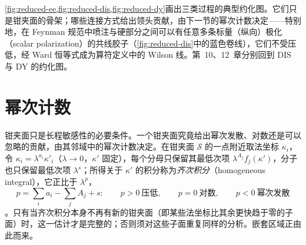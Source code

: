 \cref{fig:reduced-ee,fig:reduced-dis,fig:reduced-dy}画出三类过程的典型约化图。它们只是钳夹面的骨架；哪些连接方式给出领头贡献，由下一节的幂次计数决定——特别地，在 Feynman 规范中喷注与硬部分之间可以有任意多条标量（纵向）极化（scalar polarization）的共线胶子（\cref{fig:reduced-dis}中的蓝色卷线），它们不受压低，经 Ward 恒等式成为算符定义中的 Wilson 线。第~10、12~章分别回到 DIS 与 DY 的约化图。
\section{幂次计数}\label{sec:ir-power}

钳夹面只是长程敏感性的必要条件。一个钳夹面究竟给出幂次发散、对数还是可以忽略的贡献，由其邻域中的幂次计数决定\cite[第~2.3~节]{Sterman:1995fz}。在钳夹面 $\mathcal S$ 的一点附近取法坐标 $\kappa_i$，令 $\kappa_i=\lambda^{a_i}\kappa'_i$（$\lambda\to0$，$\kappa'$ 固定），每个分母只保留其最低次项 $\lambda^{A_j}f_j(\kappa')$，分子也只保留最低次项 $\lambda^{s}$；所得关于 $\kappa'$ 的积分称为\emph{齐次积分}（homogeneous integral），它正比于 $\lambda^{p}$，
\begin{equation}\label{eq:ir-pgeneric}
p=\sum_ia_i-\sum_jA_j+s :\qquad p>0\ \text{压低},\qquad p=0\ \text{对数},\qquad p<0\ \text{幂次发散}
\end{equation}
\cite[式~(60)--(62)]{Sterman:1995fz}。只有当齐次积分本身不再有新的钳夹面（即某些法坐标比其余更快趋于零的子面）时，这一估计才是完整的；否则须对这些子面重复同样的分析。嵌套区域正由此而来。

